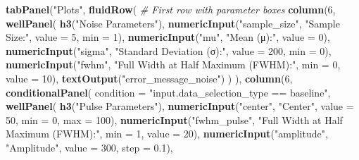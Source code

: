 \documentclass[
]{article}
\newenvironment{Shaded}{\begin{snugshade}}{\end{snugshade}}
\newcommand{\AttributeTok}[1]{\textcolor[rgb]{0.13,0.29,0.53}{#1}}
\newcommand{\CommentTok}[1]{\textcolor[rgb]{0.56,0.35,0.01}{\textit{#1}}}
\newcommand{\DecValTok}[1]{\textcolor[rgb]{0.00,0.00,0.81}{#1}}
\newcommand{\FloatTok}[1]{\textcolor[rgb]{0.00,0.00,0.81}{#1}}
\newcommand{\FunctionTok}[1]{\textcolor[rgb]{0.13,0.29,0.53}{\textbf{#1}}}
\newcommand{\NormalTok}[1]{#1}
\newcommand{\StringTok}[1]{\textcolor[rgb]{0.31,0.60,0.02}{#1}}
\begin{document}
\begin{Shaded}
\begin{Highlighting}[]
    
    \FunctionTok{tabPanel}\NormalTok{(}\StringTok{"Plots"}\NormalTok{,}
             \FunctionTok{fluidRow}\NormalTok{(}
               \CommentTok{\# First row with parameter boxes}
               \FunctionTok{column}\NormalTok{(}\DecValTok{6}\NormalTok{,}
                      \FunctionTok{wellPanel}\NormalTok{(}
                        \FunctionTok{h3}\NormalTok{(}\StringTok{"Noise Parameters"}\NormalTok{),}
                        \FunctionTok{numericInput}\NormalTok{(}\StringTok{"sample\_size"}\NormalTok{, }\StringTok{"Sample Size:"}\NormalTok{, }\AttributeTok{value =} \DecValTok{5}\NormalTok{, }\AttributeTok{min =} \DecValTok{1}\NormalTok{),}
                        \FunctionTok{numericInput}\NormalTok{(}\StringTok{"mu"}\NormalTok{, }\StringTok{"Mean (μ):"}\NormalTok{, }\AttributeTok{value =} \DecValTok{0}\NormalTok{),}
                        \FunctionTok{numericInput}\NormalTok{(}\StringTok{"sigma"}\NormalTok{, }\StringTok{"Standard Deviation (σ):"}\NormalTok{, }\AttributeTok{value =} \DecValTok{200}\NormalTok{, }\AttributeTok{min =} \DecValTok{0}\NormalTok{),}
                        \FunctionTok{numericInput}\NormalTok{(}\StringTok{"fwhm"}\NormalTok{, }\StringTok{"Full Width at Half Maximum (FWHM):"}\NormalTok{, }\AttributeTok{min =} \DecValTok{0}\NormalTok{, }\AttributeTok{value =} \DecValTok{10}\NormalTok{),}
                        \FunctionTok{textOutput}\NormalTok{(}\StringTok{"error\_message\_noise"}\NormalTok{)}
\NormalTok{                      )}
\NormalTok{               ),}
               \FunctionTok{column}\NormalTok{(}\DecValTok{6}\NormalTok{,}
                      \FunctionTok{conditionalPanel}\NormalTok{(}
                        \AttributeTok{condition =} \StringTok{"input.data\_selection\_type == \textquotesingle{}baseline\textquotesingle{}"}\NormalTok{,}
                        \FunctionTok{wellPanel}\NormalTok{(}
                          \FunctionTok{h3}\NormalTok{(}\StringTok{"Pulse Parameters"}\NormalTok{),}
                          \FunctionTok{numericInput}\NormalTok{(}\StringTok{"center"}\NormalTok{, }\StringTok{"Center"}\NormalTok{, }\AttributeTok{value =} \DecValTok{50}\NormalTok{, }\AttributeTok{min =} \DecValTok{0}\NormalTok{, }\AttributeTok{max =} \DecValTok{100}\NormalTok{),}
                          \FunctionTok{numericInput}\NormalTok{(}\StringTok{"fwhm\_pulse"}\NormalTok{, }\StringTok{"Full Width at Half Maximum (FWHM):"}\NormalTok{, }\AttributeTok{min =} \DecValTok{1}\NormalTok{, }\AttributeTok{value =} \DecValTok{20}\NormalTok{),}
                          \FunctionTok{numericInput}\NormalTok{(}\StringTok{"amplitude"}\NormalTok{, }\StringTok{"Amplitude"}\NormalTok{, }\AttributeTok{value =} \DecValTok{300}\NormalTok{, }\AttributeTok{step =} \FloatTok{0.1}\NormalTok{),}

\end{Highlighting}
\end{Shaded}
\end{document}
